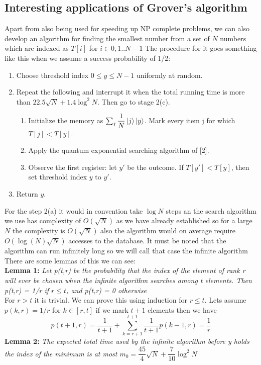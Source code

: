 \documentclass{report}
\begin{document}
\subsection{Interesting applications of Grover's algorithm}
Apart from also being used for speeding up NP complete problems, we can also develop an algorithm for finding the smallest number from a set of $N$ numbers which are indexed as $T[i]$ for $i \in {0,1..N-1}$
The procedure for it goes something like this when we assume a success probability of 1/2:
\begin{enumerate}
    \item Choose threshold index $0\leq y\leq N-1$ uniformly at random.
    \item Repeat the following and interrupt it when the
    total running time is more than $22.5\sqrt{N} + 1.4\log^{2}N$. Then go to stage 2(c).
    \begin{enumerate}
        \item Initialize the memory as $\sum_{j}\dfrac{1}{N}\ket{j}\ket{y}$. Mark every item j for which $T[j] < T[y]$.
        \item Apply the quantum exponential searching algorithm of [2].
        \item Observe the first register: let $y'$ be the outcome. If $T[y'] < T[y]$, then set threshold index $y$ to $y'$.
    \end{enumerate}
    \item Return $y$.
\end{enumerate}
For the step 2(a) it would in convention take $\log{N}$ steps an the search algorithm we use has complexity of $O(\sqrt{N})$ as we have already established so for a large $N$ the complexity is $O(\sqrt{N})$  also the algorithm would on average require $O(\log(N)\sqrt{N})$ accesses to the database. It must be noted that the algorithm can run infinitely long so we will call that case the infinite algorithm There are some lemmas of this we can see:\\
\textbf{Lemma 1: }\textit{Let p(t,r) be the probability that the index of the element of rank r will ever be chosen when the infinite algorithm searches among t elements. Then p(t,r) = 1/r if $r \leq t$, and p(t,r) = 0 otherwise}\\
For $r > t$ it is trivial. We can prove this using induction for $r \leq t$. Lets assume $p(k,r) = 1/r$ for $k \in [r,t]$ if we mark $t+1$ elements then we have
$$p(t+1,r) = \dfrac{1}{t+1} + \sum_{k=r+1}^{t+1}\dfrac{1}{t+1}p(k-1,r) = \dfrac{1}{r}$$
\textbf{Lemma 2: }\textit{The expected total time used by the infinite algorithm before y holds the index of the minimum is at most $m_0 = \dfrac{45}{4}\sqrt{N} + \dfrac{7}{10}\log^2N$}\\
\end{document}
